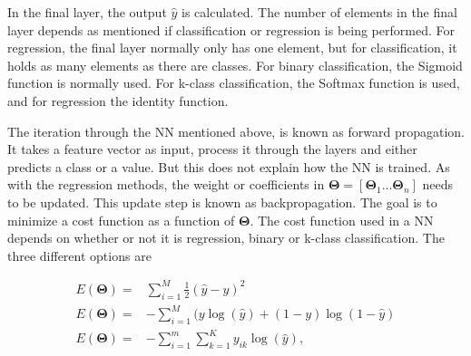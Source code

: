             
            In the final layer, the output $\hat y$ is calculated. The number of elements in the final layer depends as mentioned if classification or regression is being performed. For regression, the final layer normally only has one element, but for classification, it holds as many elements as there are classes. For binary classification, the Sigmoid function is normally used. For k-class classification, the Softmax function is used, and for regression the identity function. 
            
            
            
            The iteration through the NN mentioned above, is known as forward propagation. It takes a feature vector as input, process it through the layers and either predicts a class or a value. But this does not explain how the NN is trained. As with the regression methods, the weight or coefficients in $\bm \Theta = [\bm \Theta_1 ... \bm \Theta_n]$ needs  to be updated.  This update step is known as backpropagation. The goal is to minimize a cost function as a function of $\bm \Theta$. The cost function used in a NN depends on whether or not it is regression, binary or k-class classification. The three different options are 
            
            \begin{align}
                E(\bm\Theta) = &\sum_{i=1}^M\frac{1}{2}(\hat{y} - y)^2 \nonumber\\
                E(\bm\Theta) = & -\sum_{i=1}^M(y\log(\hat{y})+(1-y)\log(1-\hat{y}) \nonumber\\
                E(\bm\Theta) = &- \sum_{i=1}^m \sum_{k=1}^K y_{ik}\log(\hat y),
                \label{nn:cost}
            \end{align}
            

